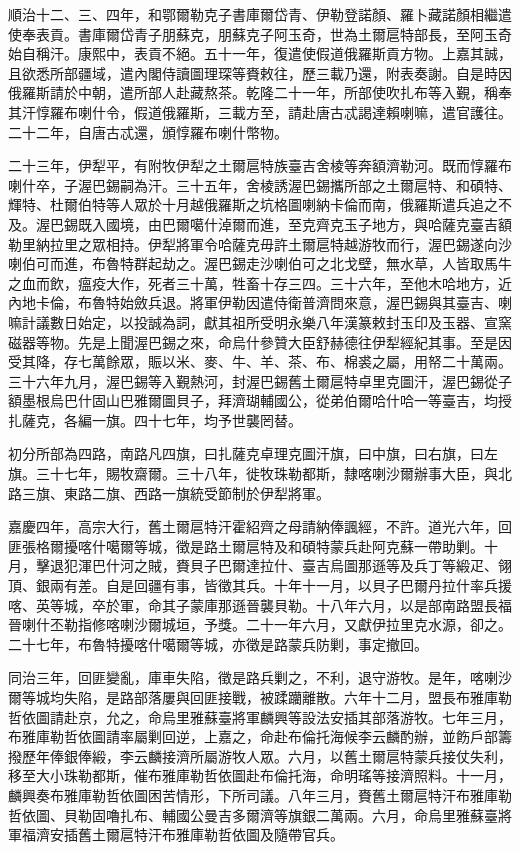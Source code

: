 \begin{pinyinscope}
順治十二、三、四年，和鄂爾勒克子書庫爾岱青、伊勒登諾顏、羅卜藏諾顏相繼遣使奉表貢。書庫爾岱青子朋蘇克，朋蘇克子阿玉奇，世為土爾扈特部長，至阿玉奇始自稱汗。康熙中，表貢不絕。五十一年，復遣使假道俄羅斯貢方物。上嘉其誠，且欲悉所部疆域，遣內閣侍讀圖理琛等賚敕往，歷三載乃還，附表奏謝。自是時因俄羅斯請於中朝，遣所部人赴藏熬茶。乾隆二十一年，所部使吹扎布等入覲，稱奉其汗惇羅布喇什令，假道俄羅斯，三載方至，請赴唐古忒謁達賴喇嘛，遣官護往。二十二年，自唐古忒還，頒惇羅布喇什幣物。

二十三年，伊犁平，有附牧伊犁之土爾扈特族臺吉舍棱等奔額濟勒河。既而惇羅布喇什卒，子渥巴錫嗣為汗。三十五年，舍棱誘渥巴錫攜所部之土爾扈特、和碩特、輝特、杜爾伯特等人眾於十月越俄羅斯之坑格圖喇納卡倫而南，俄羅斯遣兵追之不及。渥巴錫既入國境，由巴爾噶什淖爾而進，至克齊克玉子地方，與哈薩克臺吉額勒里納拉里之眾相持。伊犁將軍令哈薩克毋許土爾扈特越游牧而行，渥巴錫遂向沙喇伯可而進，布魯特群起劫之。渥巴錫走沙喇伯可之北戈壁，無水草，人皆取馬牛之血而飲，瘟疫大作，死者三十萬，牲畜十存三四。三十六年，至他木哈地方，近內地卡倫，布魯特始斂兵退。將軍伊勒因遣侍衛普濟問來意，渥巴錫與其臺吉、喇嘛計議數日始定，以投誠為詞，獻其祖所受明永樂八年漢篆敕封玉印及玉器、宣窯磁器等物。先是上聞渥巴錫之來，命烏什參贊大臣舒赫德往伊犁經紀其事。至是因受其降，存七萬餘眾，賑以米、麥、牛、羊、茶、布、棉裘之屬，用帑二十萬兩。三十六年九月，渥巴錫等入覲熱河，封渥巴錫舊土爾扈特卓里克圖汗，渥巴錫從子額墨根烏巴什固山巴雅爾圖貝子，拜濟瑚輔國公，從弟伯爾哈什哈一等臺吉，均授扎薩克，各編一旗。四十七年，均予世襲罔替。

初分所部為四路，南路凡四旗，曰扎薩克卓理克圖汗旗，曰中旗，曰右旗，曰左旗。三十七年，賜牧齋爾。三十八年，徙牧珠勒都斯，隸喀喇沙爾辦事大臣，與北路三旗、東路二旗、西路一旗統受節制於伊犁將軍。

嘉慶四年，高宗大行，舊土爾扈特汗霍紹齊之母請納俸諷經，不許。道光六年，回匪張格爾擾喀什噶爾等城，徵是路土爾扈特及和碩特蒙兵赴阿克蘇一帶助剿。十月，擊退犯渾巴什河之賊，賚貝子巴爾達拉什、臺吉烏圖那遜等及兵丁等緞疋、翎頂、銀兩有差。自是回疆有事，皆徵其兵。十年十一月，以貝子巴爾丹拉什率兵援喀、英等城，卒於軍，命其子蒙庫那遜晉襲貝勒。十八年六月，以是部南路盟長福晉喇什丕勒指修喀喇沙爾城垣，予獎。二十一年六月，又獻伊拉里克水源，卻之。二十七年，布魯特擾喀什噶爾等城，亦徵是路蒙兵防剿，事定撤回。

同治三年，回匪變亂，庫車失陷，徵是路兵剿之，不利，退守游牧。是年，喀喇沙爾等城均失陷，是路部落屢與回匪接戰，被蹂躪離散。六年十二月，盟長布雅庫勒哲依圖請赴京，允之，命烏里雅蘇臺將軍麟興等設法安插其部落游牧。七年三月，布雅庫勒哲依圖請率屬剿回逆，上嘉之，命赴布倫托海候李云麟酌辦，並飭戶部籌撥歷年俸銀俸緞，李云麟接濟所屬游牧人眾。六月，以舊土爾扈特蒙兵接仗失利，移至大小珠勒都斯，催布雅庫勒哲依圖赴布倫托海，命明瑤等接濟照料。十一月，麟興奏布雅庫勒哲依圖困苦情形，下所司議。八年三月，賚舊土爾扈特汗布雅庫勒哲依圖、貝勒固嚕扎布、輔國公曼吉多爾濟等旗銀二萬兩。六月，命烏里雅蘇臺將軍福濟安插舊土爾扈特汗布雅庫勒哲依圖及隨帶官兵。


\end{pinyinscope}
